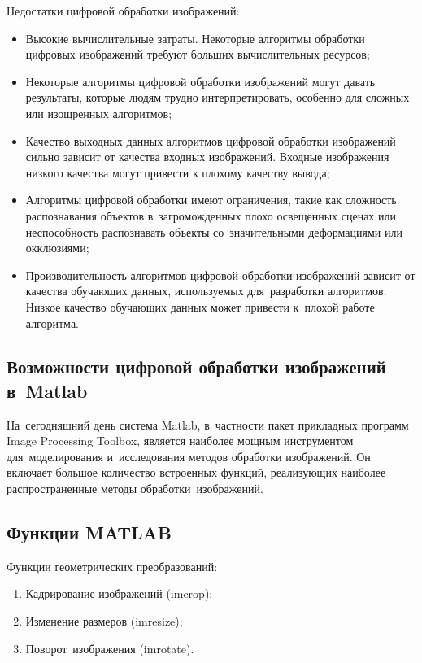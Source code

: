 \documentclass{ou}
\begin{document}
Недостатки цифровой обработки изображений:
\begin{itemize}[label=-, leftmargin=0em, itemindent=3.35em, nosep]
\item Высокие вычислительные затраты. Некоторые алгоритмы обработки цифровых изображений требуют больших вычислительных ресурсов;
\item Некоторые алгоритмы цифровой обработки изображений могут давать результаты, которые людям трудно интерпретировать, особенно для сложных или изощренных алгоритмов;
\item Качество выходных данных алгоритмов цифровой обработки изображений сильно зависит от качества входных изображений. Входные изображения низкого качества могут привести к плохому качеству вывода;
\item Алгоритмы цифровой обработки имеют ограничения, такие как сложность распознавания объектов в~загроможденных плохо освещенных сценах или неспособность распознавать объекты со~значительными деформациями или окклюзиями;
\item Производительность алгоритмов цифровой обработки изображений зависит от качества обучающих данных, используемых для~разработки алгоритмов. Низкое качество обучающих данных может привести к~плохой работе алгоритма\cite{сyberleninka}.
\end{itemize}
\subsection{Возможности цифровой обработки изображений в~Matlab}
На~сегодняшний день система Matlab, в~частности пакет прикладных программ Image Processing Toolbox, является наиболее мощным инструментом для~моделирования и~исследования методов обработки изображений. Он включает большое количество встроенных функций, реализующих наиболее распространенные методы обработки~изображений\cite{exponenta}.
\subsection{Функции MATLAB}
Функции геометрических преобразований:
\begin{enumerate}[leftmargin=0em, itemindent=3.75em, nosep, label=\arabic*)]
\item Кадрирование изображений (imcrop);
\item Изменение размеров (imresize);
\item Поворот~изображения (imrotate).
\end{enumerate}
\end{document}
